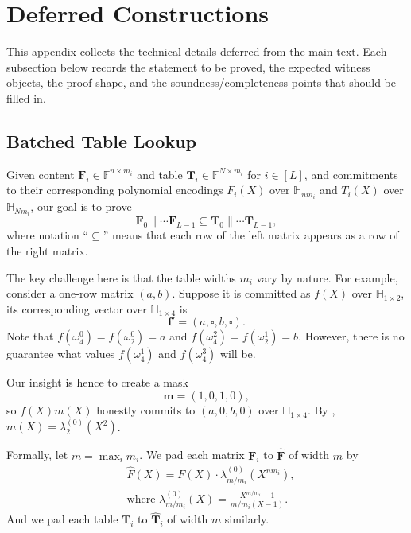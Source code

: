 \section{Deferred Constructions}\label{app:deferred-constructions}

This appendix collects the technical details deferred from the main text. Each
subsection below records the statement to be proved, the expected witness
objects, the proof shape, and the soundness/completeness points that should be
filled in.

\subsection{Batched Table Lookup}\label{app:concatenated-table-lookup}

Given content $\mathbf{F}_i\in \mathbb{F}^{n \times m_i}$
  and table $\mathbf{T}_i\in \mathbb{F}^{N\times m_i}$ for $i\in [L]$,
  and commitments to their corresponding polynomial encodings
  $F_i(X)$ over $\mathbb{H}_{n m_i}$
  and $T_i(X)$ over $\mathbb{H}_{N m_i}$,
  our goal is to prove
  \[
    \mathbf{F}_0\| \cdots \mathbf{F}_{L-1} \subseteq \mathbf{T}_0\| \cdots \mathbf{T}_{L-1},
  \]
  where notation ``$\subseteq$'' means
  that each row of the left matrix appears as a row of the right matrix.

The key challenge here is that the table widths $m_i$ vary
  by nature.
  For example, consider a one-row matrix $(a, b)$.
  Suppose it is committed as $f(X)$ over $\mathbb{H}_{1\times 2}$,
  its corresponding vector over $\mathbb{H}_{1\times 4}$ is
  \[
    \mathbf{f}' = (a, \square, b, \square).
  \]
  Note that $f(\omega_4^0) = f(\omega_2^0) = a$
  and $f(\omega_4^2) = f(\omega_2^1) = b$.
  However, there is no guarantee what values
  $f(\omega_4^1)$ and $f(\omega_4^3)$ will be.

Our insight is hence to create a mask
  \[
      \mathbf{m} = (1, 0, 1, 0),
  \]
  so $f(X)m(X)$ honestly commits to $(a, 0, b, 0)$ over $\mathbb{H}_{1\times 4}$.
  By , $m(X) = \lambda^{(0)}_2(X^2)$.

Formally, let $m = \max_i m_i$. We pad each matrix $\mathbf{F}_i$
  to $\widehat{\mathbf{F}}$ of width $m$ by
  \begin{align}
    & \widehat{F}(X) = F(X)\cdot \lambda^{(0)}_{m/m_i}(X^{nm_i}),\\
    & \text{where } \lambda^{(0)}_{m/m_i}(X) = \frac{X^{m/m_i} - 1}{m/m_i(X-1)}.
  \end{align}
  And we pad each table $\mathbf{T}_i$ to $\widehat{\mathbf{T}}_i$ of width $m$ similarly.

